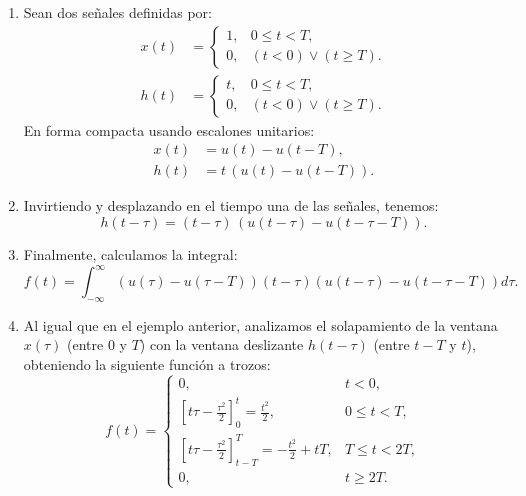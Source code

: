 \begin{enumerate}
	
	\item Sean dos señales definidas por:
	\begin{align}
		x(t) &= \begin{cases}
			1, & 0 \leq t < T, \\ 
			0, & (t < 0) \lor (t \geq T).
		\end{cases} \\
		h(t) &= \begin{cases}
			t, & 0 \leq t < T, \\ 
			0, & (t < 0) \lor (t \geq T).
		\end{cases}
	\end{align}
	En forma compacta usando escalones unitarios:
	\begin{align}
		x(t) &= u(t) - u(t-T) , \\
		h(t) &= t \, (u(t) - u(t-T)) .
	\end{align}
	
	\item Invirtiendo y desplazando en el tiempo una de las señales, tenemos:
	\begin{equation}
		h(t-\tau) = (t-\tau) \, (u(t-\tau) - u(t-\tau -T)) .
	\end{equation}
	
	\item Finalmente, calculamos la integral:
	\begin{equation}
		f(t) = \int_{-\infty}^{\infty} \left( u(\tau) - u(\tau-T) \right) (t-\tau) \left( u(t-\tau) - u(t-\tau-T) \right) d\tau.
	\end{equation}
	
	\item Al igual que en el ejemplo anterior, analizamos el solapamiento de la ventana $x(\tau)$ (entre $0$ y $T$) con la ventana deslizante $h(t-\tau)$ (entre $t-T$ y $t$), obteniendo la siguiente función a trozos:
	\begin{equation}
		f(t) = \begin{cases}
			0, & t < 0, \\
			\left[ t \tau - \frac{\tau^2}{2} \right]_{0}^{t} = \frac{t^2}{2}, & 0 \leq t < T, \\
			\left[ t \tau - \frac{\tau^2}{2} \right]_{t-T}^{T} = -\frac{t^2}{2} + tT, & T \leq t < 2T, \\
			0, & t \geq 2T.
		\end{cases}
	\end{equation}
	
\end{enumerate}
